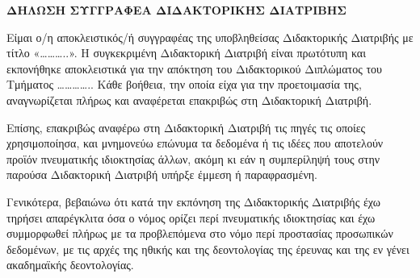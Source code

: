 \cleardoublepage




{\selectfont
\selg

\begin{center}
    \textbf{\large ΔΗΛΩΣΗ ΣΥΓΓΡΑΦΕΑ ΔΙΔΑΚΤΟΡΙΚΗΣ ΔΙΑΤΡΙΒΗΣ}
\end{center}

Είμαι ο/η αποκλειστικός/ή συγγραφέας της υποβληθείσας Διδακτορικής Διατριβής με τίτλο «………..». Η συγκεκριμένη Διδακτορική Διατριβή είναι πρωτότυπη και εκπονήθηκε αποκλειστικά για την απόκτηση του Διδακτορικού Διπλώματος του Τμήματος ………….. Κάθε βοήθεια, την οποία είχα για την προετοιμασία της, αναγνωρίζεται πλήρως και αναφέρεται επακριβώς στη Διδακτορική Διατριβή. 

Επίσης, επακριβώς αναφέρω στη Διδακτορική Διατριβή τις πηγές τις οποίες χρησιμοποίησα, και μνημονεύω επώνυμα τα δεδομένα ή τις ιδέες που αποτελούν προϊόν πνευματικής ιδιοκτησίας άλλων, ακόμη κι εάν η συμπερίληψή τους στην παρούσα Διδακτορική Διατριβή υπήρξε έμμεση ή παραφρασμένη. 

Γενικότερα, βεβαιώνω ότι κατά την εκπόνηση της Διδακτορικής Διατριβής έχω τηρήσει απαρέγκλιτα όσα ο νόμος ορίζει περί πνευματικής ιδιοκτησίας και έχω συμμορφωθεί πλήρως με τα προβλεπόμενα στο νόμο περί προστασίας προσωπικών δεδομένων, με τις αρχές της ηθικής και της δεοντολογίας της έρευνας και της εν γένει ακαδημαϊκής δεοντολογίας.

}

\selam